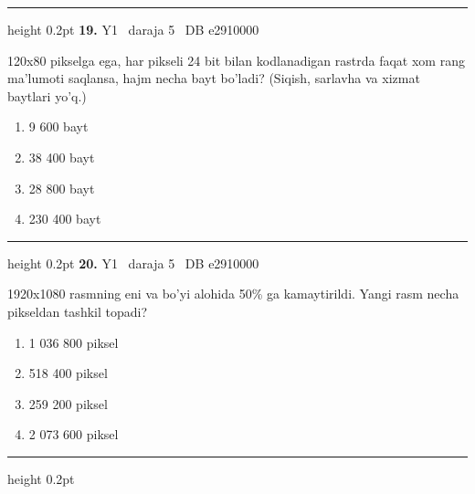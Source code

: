 \documentclass[10pt,a4paper,oneside]{article}
\begin{document}
\vspace{2mm}\hrule height 0.2pt \vspace{4mm}
\hypertarget{q19}{\textbf{\color{ink}19.}}  {\color{muted}\scriptsize Y1 \textbullet\ daraja 5 \textbullet\ DB e2910000}
\par
120x80 pikselga ega, har pikseli 24 bit bilan kodlanadigan rastrda faqat xom rang ma'lumoti saqlansa, hajm necha bayt bo'ladi? (Siqish, sarlavha va xizmat baytlari yo'q.)
\begin{enumerate}[label=\Alph*),leftmargin=9mm]
\item 9 600 bayt
\item 38 400 bayt
\item 28 800 bayt
\item 230 400 bayt
\end{enumerate}
\vspace{2mm}\hrule height 0.2pt \vspace{4mm}
\hypertarget{q20}{\textbf{\color{ink}20.}}  {\color{muted}\scriptsize Y1 \textbullet\ daraja 5 \textbullet\ DB e2910000}
\par
1920x1080 rasmning eni va bo'yi alohida 50\% ga kamaytirildi. Yangi rasm necha pikseldan tashkil topadi?
\begin{enumerate}[label=\Alph*),leftmargin=9mm]
\item 1 036 800 piksel
\item 518 400 piksel
\item 259 200 piksel
\item 2 073 600 piksel
\end{enumerate}
\vspace{2mm}\hrule height 0.2pt \vspace{4mm}
\end{document}
